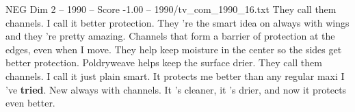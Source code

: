 \begin{textsample}{NEG Dim 2 – 1990 – Score -1.00 – 1990/tv\_com\_1990\_16.txt}  \label{ex:f2_neg_066}
They call them channels.
I call it better protection.
They 're the smart idea on always with wings and they 're pretty amazing.
Channels that form a barrier of protection at the edges, even when I move.
They help keep moisture in the center so the sides get better protection.
Poldryweave helps keep the surface drier.
They call them channels.
I call it just plain smart.
It protects me better than any regular maxi I 've \textbf{tried}.
New always with channels.
It 's cleaner, it 's drier, and now it protects even better.

\end{textsample}
